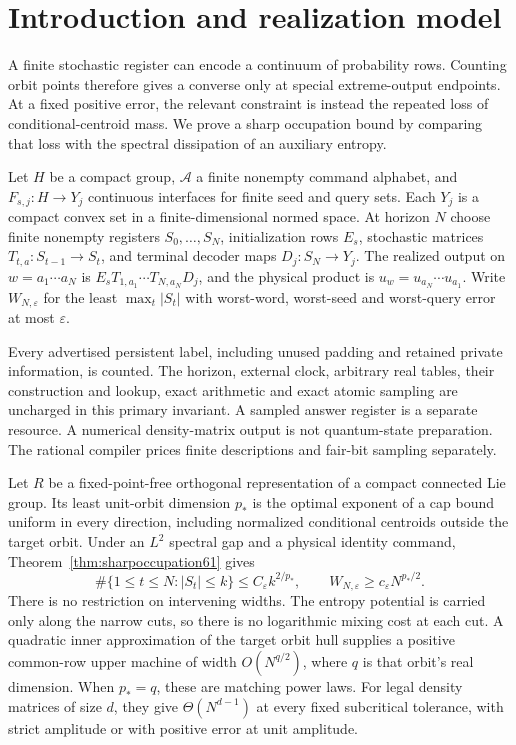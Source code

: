 \section{Introduction and realization model}
A finite stochastic register can encode a continuum of probability
rows. Counting orbit points therefore gives a converse only at special
extreme-output endpoints. At a fixed positive error, the relevant
constraint is instead the repeated loss of conditional-centroid mass.
We prove a sharp occupation bound by comparing that loss with the
spectral dissipation of an auxiliary entropy.

\begin{definition}\label{def:machine54}
Let $H$ be a compact group, $\mathcal A$ a finite nonempty command
alphabet, and $F_{s,j}:H\to Y_j$ continuous interfaces for finite seed
and query sets. Each $Y_j$ is a compact convex set in a finite-dimensional
normed space. At horizon $N$ choose finite nonempty registers
$S_0,\ldots,S_N$, initialization rows $E_s$, stochastic matrices
$T_{t,a}:S_{t-1}\to S_t$, and terminal decoder maps $D_j:S_N\to Y_j$.
The realized output on $w=a_1\cdots a_N$ is
$E_sT_{1,a_1}\cdots T_{N,a_N}D_j$, and the physical product is
$u_w=u_{a_N}\cdots u_{a_1}$. Write $W_{N,\varepsilon}$ for the least
$\max_t|S_t|$ with worst-word, worst-seed and worst-query error at most
$\varepsilon$.
\end{definition}
Every advertised persistent label, including unused padding and retained
private information, is counted. The horizon, external clock, arbitrary
real tables, their construction and lookup, exact arithmetic and exact
atomic sampling are uncharged in this primary invariant. A sampled
answer register is a separate resource. A numerical density-matrix
output is not quantum-state preparation. The rational compiler prices
finite descriptions and fair-bit sampling separately.

Let $R$ be a fixed-point-free orthogonal representation of a compact
connected Lie group. Its least unit-orbit dimension $p_*$ is the optimal
exponent of a cap bound uniform in every direction, including normalized
conditional centroids outside the target orbit. Under an $L^2$ spectral
gap and a physical identity command, Theorem~\ref{thm:sharpoccupation61}
gives
\[
 \#\{1\le t\le N:|S_t|\le k\}\le C_\varepsilon k^{2/p_*},
 \qquad W_{N,\varepsilon}\ge c_\varepsilon N^{p_*/2}.
\]
There is no restriction on intervening widths. The entropy potential
is carried only along the narrow cuts, so there is no logarithmic
mixing cost at each cut. A quadratic inner approximation of the target
orbit hull supplies a positive common-row upper machine of width
$O(N^{q/2})$, where $q$ is that orbit's real dimension. When $p_*=q$,
these are matching power laws. For legal density matrices of size $d$,
they give $\Theta(N^{d-1})$ at every fixed subcritical tolerance, with
strict amplitude or with positive error at unit amplitude.

